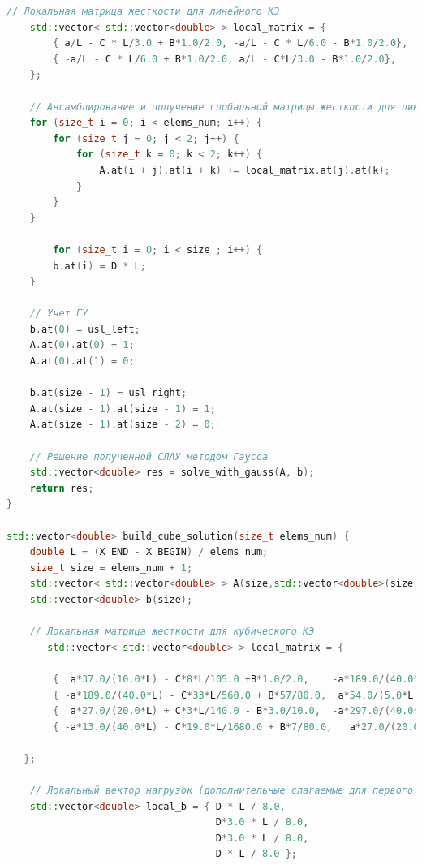 \begin{lstlisting}[language=c++, label=prog,caption={\textit{Реализация МКЭ}}]
    // Локальная матрица жесткости для линейного КЭ
    std::vector< std::vector<double> > local_matrix = {
        { a/L - C * L/3.0 + B*1.0/2.0, -a/L - C * L/6.0 - B*1.0/2.0},
        { -a/L - C * L/6.0 + B*1.0/2.0, a/L - C*L/3.0 - B*1.0/2.0},
    };
    
    // Ансамблирование и получение глобальной матрицы жесткости для линейного КЭ
    for (size_t i = 0; i < elems_num; i++) {
        for (size_t j = 0; j < 2; j++) {
            for (size_t k = 0; k < 2; k++) {
                A.at(i + j).at(i + k) += local_matrix.at(j).at(k);
            }
        }
    }
    
        for (size_t i = 0; i < size ; i++) {
        b.at(i) = D * L;
    }
    
    // Учет ГУ 
    b.at(0) = usl_left;
    A.at(0).at(0) = 1;
    A.at(0).at(1) = 0;
    
    b.at(size - 1) = usl_right;
    A.at(size - 1).at(size - 1) = 1;
    A.at(size - 1).at(size - 2) = 0;
    
    // Решение полученной СЛАУ методом Гаусса
    std::vector<double> res = solve_with_gauss(A, b);
    return res;
}

std::vector<double> build_cube_solution(size_t elems_num) {
    double L = (X_END - X_BEGIN) / elems_num;
    size_t size = elems_num + 1;
    std::vector< std::vector<double> > A(size,std::vector<double>(size));
    std::vector<double> b(size);
    
    // Локальная матрица жесткости для кубического КЭ
       std::vector< std::vector<double> > local_matrix = {

        {  a*37.0/(10.0*L) - C*8*L/105.0 +B*1.0/2.0,    -a*189.0/(40.0*L) - C*33*L/560.0 - B*57/80.0, a*27.0/(20.0*L) + C*3*L/140.0 + B*3.0/10.0, -a*13.0/(40.0*L) -  C*19.0*L/1680.0 - B*7/80.0},
        { -a*189.0/(40.0*L) - C*33*L/560.0 + B*57/80.0,  a*54.0/(5.0*L)-C*27*L/70.0,                  -a*297.0/(40*L) + C*27*L/560.0 - B*81.0/80.0,    a*27.0/(20.0*L) +  C*3*L/140.0 + B*3.0/10.0},
        {  a*27.0/(20.0*L) + C*3*L/140.0 - B*3.0/10.0,  -a*297.0/(40.0*L) + C*27*L/560.0 + B*81.0/80.0,  a*54.0/(5.0*L) - C*27*L/70.0,                -a*189.0/(40.0*L) - C*33*L/560.0 - B*57/80.0},
        { -a*13.0/(40.0*L) - C*19.0*L/1680.0 + B*7/80.0,   a*27.0/(20.0*L) + C*3*L/140.0 - B*3.0/10.0 , -a*189.0/(40.0*L) - C*33*L/560.0 + B*57/80.0,      a*37.0/(10.0*L) - C*8*L/105.0 - B*1.0/2.0}
        
   };
    
    // Локальный вектор нагрузок (дополнительные слагаемые для первого и последнего элементов учитываются далее)
    std::vector<double> local_b = { D * L / 8.0,
                                    D*3.0 * L / 8.0,
                                    D*3.0 * L / 8.0, 
                                    D * L / 8.0 };


\end{lstlisting}
